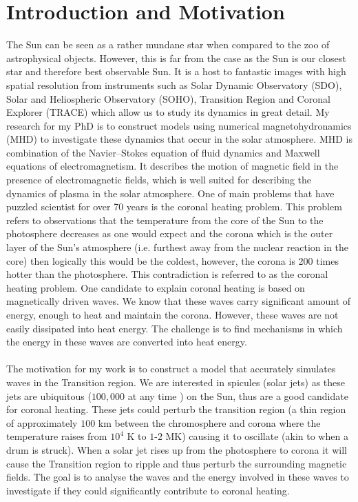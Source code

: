 \documentclass[12pt,a4paper,twoside]{article}
\begin{document}
\section{Introduction and Motivation}
The Sun can be seen as a rather mundane star when compared to the zoo of astrophysical objects. However, this is far from the case as the Sun is our closest star and therefore best observable Sun. It is a host to fantastic images with high spatial resolution from instruments such as Solar Dynamic Observatory (SDO), Solar and Heliospheric Observatory (SOHO), Transition Region and Coronal Explorer (TRACE) which allow us to study its dynamics in great detail. My research for my PhD is to construct models using numerical magnetohydronamics (MHD) to investigate these dynamics that occur in the solar atmosphere. MHD is combination of the Navier$–$Stokes equation of fluid dynamics and Maxwell equations of electromagnetism. It describes the motion of magnetic field in the presence of electromagnetic fields, which is well suited for describing the dynamics of plasma in the solar atmosphere. One of main problems that have puzzled scientist for over 70 years is the coronal heating problem. This problem refers to observations that the temperature from the core of the Sun to the photosphere decreases as one would expect and the corona which is the outer layer of the Sun's atmosphere (i.e. furthest away from the nuclear reaction in the core) then logically this would be the coldest, however, the corona is 200 times hotter than the photosphere. This contradiction is referred to as the coronal heating problem. One candidate to explain coronal heating is based on magnetically driven waves. We know that these waves carry significant amount of energy, enough to heat and maintain the corona. However, these waves are not easily dissipated into heat energy. The challenge is to find mechanisms in which the energy in these waves are converted into heat energy.  \\ \\
The motivation for my work is to construct a model that accurately simulates waves in the Transition region. We are interested in spicules (solar jets) as these jets are ubiquitous ($100,000$  at  any  time \citep{Beckers1968}) on the Sun, thus are a good candidate for coronal heating. These jets could perturb the transition region (a thin region of approximately $100$ km between the chromosphere and corona where the temperature raises from $10^4$ K to $1$-$2$ MK) causing it to oscillate (akin to when a drum is struck). When a solar jet rises up from the photosphere to corona it will cause the Transition region to ripple and thus perturb the surrounding magnetic fields. The goal is to analyse the waves and the energy involved in these waves to investigate if they could significantly contribute to coronal heating. 
\end{document}
